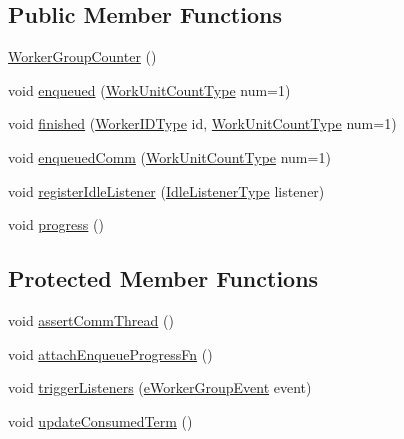 \subsection*{Public Member Functions}
\begin{DoxyCompactItemize}
\item 
\hyperlink{structvt_1_1worker_1_1_worker_group_counter_a88169cef0c2a49dc51f8f77e8136080f}{Worker\+Group\+Counter} ()
\item 
void \hyperlink{structvt_1_1worker_1_1_worker_group_counter_adbcab001bd3585539767059478456fa2}{enqueued} (\hyperlink{namespacevt_1_1worker_a8080c49350b0520151601a8b24d6c6cf}{Work\+Unit\+Count\+Type} num=1)
\item 
void \hyperlink{structvt_1_1worker_1_1_worker_group_counter_a6b77b96f91b97de8d59685a2504a9e6a}{finished} (\hyperlink{namespacevt_a656e362091da17b9b93d0655b36e3392}{Worker\+I\+D\+Type} id, \hyperlink{namespacevt_1_1worker_a8080c49350b0520151601a8b24d6c6cf}{Work\+Unit\+Count\+Type} num=1)
\item 
void \hyperlink{structvt_1_1worker_1_1_worker_group_counter_af638994494fff8661d7cef5008014ab8}{enqueued\+Comm} (\hyperlink{namespacevt_1_1worker_a8080c49350b0520151601a8b24d6c6cf}{Work\+Unit\+Count\+Type} num=1)
\item 
void \hyperlink{structvt_1_1worker_1_1_worker_group_counter_a8b08821803e2b9ecad9167dc79d2795c}{register\+Idle\+Listener} (\hyperlink{structvt_1_1worker_1_1_worker_group_counter_ae91ad4af172549bb99e1b7c32a1a0f71}{Idle\+Listener\+Type} listener)
\item 
void \hyperlink{structvt_1_1worker_1_1_worker_group_counter_aa8ff0b55fb1a1501690db258ced55899}{progress} ()
\end{DoxyCompactItemize}
\subsection*{Protected Member Functions}
\begin{DoxyCompactItemize}
\item 
void \hyperlink{structvt_1_1worker_1_1_worker_group_counter_a30b0164f0d85080bb272e8930b02df4c}{assert\+Comm\+Thread} ()
\item 
void \hyperlink{structvt_1_1worker_1_1_worker_group_counter_a20ddb42ebdebae2134ecb33feef95d19}{attach\+Enqueue\+Progress\+Fn} ()
\item 
void \hyperlink{structvt_1_1worker_1_1_worker_group_counter_a39e2bdc226316ec5d4cddc3a6d10fb52}{trigger\+Listeners} (\hyperlink{namespacevt_1_1worker_abcb798436f1cdc4fab035def5b912d1f}{e\+Worker\+Group\+Event} event)
\item 
void \hyperlink{structvt_1_1worker_1_1_worker_group_counter_a8aa7187f5ced78fc69e7f323817ea752}{update\+Consumed\+Term} ()
\end{DoxyCompactItemize}

